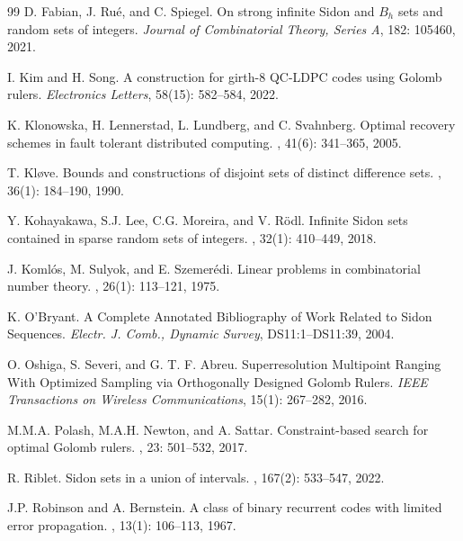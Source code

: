 \documentclass[preprint,12pt]{elsarticle}
\begin{document}
\begin{thebibliography}{99}
D. Fabian, J. Ru\'{e}, and C. Spiegel.
On strong infinite Sidon and $B_h$ sets and random sets of integers. 
{\em Journal of Combinatorial Theory, Series A},
182: 105460, 2021.

I. Kim and H. Song.
A construction for girth-8 QC-LDPC codes using Golomb rulers.
{\em Electronics Letters}, 58(15): 582--584, 2022.

K. Klonowska, H. Lennerstad, L. Lundberg, and C. Svahnberg.
\newblock Optimal recovery schemes in fault tolerant distributed computing.
, 41(6): 341--365, 2005.

T. Kl{\o}ve.
\newblock Bounds and constructions of disjoint sets of distinct difference
  sets.
, 36(1): 184--190, 1990.

Y. Kohayakawa, S.J. Lee, C.G. Moreira, and V. R\"{o}dl.
\newblock Infinite Sidon sets contained in sparse random sets of integers.
,
  32(1): 410--449, 2018.


J. Koml{\'o}s, M. Sulyok, and E. Szemer{\'e}di.
\newblock Linear problems in combinatorial number theory.
,
  26(1): 113--121, 1975.


K. O'Bryant. 
A Complete Annotated Bibliography of Work Related to Sidon Sequences.
{\em Electr. J. Comb., Dynamic Survey}, DS11:1--DS11:39, 2004.

O. Oshiga, S. Severi, and G. T. F. Abreu.
Superresolution Multipoint Ranging With Optimized Sampling via Orthogonally Designed Golomb Rulers. 
{\em IEEE Transactions on Wireless Communications}, 15(1): 267--282, 2016.

M.M.A. Polash, M.A.H. Newton, and A. Sattar. 
\newblock Constraint-based search for optimal Golomb rulers.
, 23: 501--532, 2017.


R. Riblet.
\newblock Sidon sets in a union of intervals.
, 167(2): 533--547, 2022.


J.P. Robinson and A. Bernstein.
\newblock A class of binary recurrent codes with limited error propagation.
, 13(1): 106--113, 1967.


\end{thebibliography}
\end{document}
